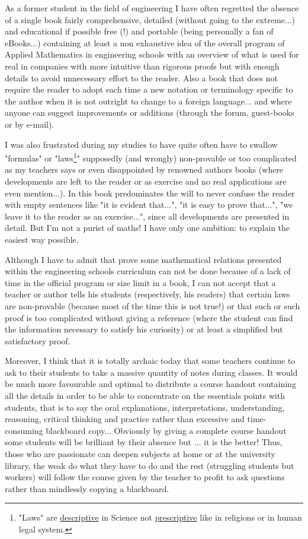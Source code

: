 	As a former student in the field of engineering I have often regretted the absence of a single book fairly comprehensive, detailed (without going to the extreme...) and educational if possible free (!) and portable (being personally a fan of eBooks...) containing at least a non exhaustive idea of the overall program of Applied Mathematics in engineering schools with an overview of what is used for real in companies with more intuitive than rigorous proofs but with enough details to avoid unnecessary effort to the reader. Also a book that does not require the reader to adopt each time a new notation or terminology specific to the author when it is not outright to change to a foreign language... and where anyone can suggest improvements or additions (through the forum, guest-books or by e-mail).

	I was also frustrated during my studies to have quite often have to swallow "formulas" or "laws\footnote{"Laws" are \underline{descriptive} in Science not \underline{prescriptive} like in religions or in human legal system.}" supposedly (and wrongly) non-provable or too complicated as my teachers says or even disappointed by renowned authors books (where developments are left to the reader or as exercise and no real applications are even mention...). In this book predominates the will to never confuse the reader with empty sentences like "it is evident that...", "it is easy to prove that...", "we leave it to the reader as an exercise...", since all developments are presented in detail. But I'm not a purist of maths! I have only one ambition: to explain the easiest way possible.

	Although I have to admit that prove some mathematical relations presented within the engineering schools curriculum can not be done because of a lack of time in the official program or size limit in a book, I can not accept that a teacher or author tells his students (respectively, his readers) that certain laws are non-provable (because most of the time this is not true!) or that such or such proof is too complicated without giving a reference (where the student can find the information necessary to satisfy his curiosity) or at least a simplified but satisfactory proof.

	Moreover, I think that it is totally archaic today that some teachers continue to ask to their students to take a massive quantity of notes during classes. It would be much more favourable and optimal to distribute a course handout containing all the details in order to be able to concentrate on the essentials points with students, that is to say the oral explanations, interpretations, understanding, reasoning, critical thinking and practice rather than excessive and time-consuming blackboard copy... Obviously by giving a complete course handout some students will be brilliant by their absence but ... it is the better! Thus, those who are passionate can deepen subjects at home or at the university library, the weak do what they have to do and the rest (struggling students but workers) will follow the course given by the teacher to profit to ask questions rather than mindlessly copying a blackboard.


